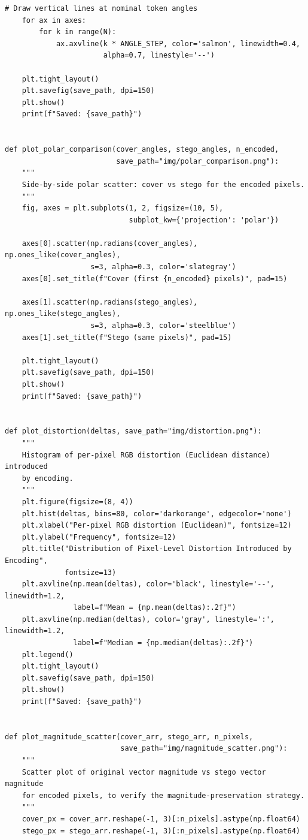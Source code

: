 \documentclass[12pt]{article}
\begin{document}
\begin{lstlisting}[caption={Comparative analysis of cover vs.\ stego image
(\texttt{analysis.py})}, label={lst:analysis}]
    # Draw vertical lines at nominal token angles
    for ax in axes:
        for k in range(N):
            ax.axvline(k * ANGLE_STEP, color='salmon', linewidth=0.4,
                       alpha=0.7, linestyle='--')

    plt.tight_layout()
    plt.savefig(save_path, dpi=150)
    plt.show()
    print(f"Saved: {save_path}")


def plot_polar_comparison(cover_angles, stego_angles, n_encoded,
                          save_path="img/polar_comparison.png"):
    """
    Side-by-side polar scatter: cover vs stego for the encoded pixels.
    """
    fig, axes = plt.subplots(1, 2, figsize=(10, 5),
                             subplot_kw={'projection': 'polar'})

    axes[0].scatter(np.radians(cover_angles), np.ones_like(cover_angles),
                    s=3, alpha=0.3, color='slategray')
    axes[0].set_title(f"Cover (first {n_encoded} pixels)", pad=15)

    axes[1].scatter(np.radians(stego_angles), np.ones_like(stego_angles),
                    s=3, alpha=0.3, color='steelblue')
    axes[1].set_title(f"Stego (same pixels)", pad=15)

    plt.tight_layout()
    plt.savefig(save_path, dpi=150)
    plt.show()
    print(f"Saved: {save_path}")


def plot_distortion(deltas, save_path="img/distortion.png"):
    """
    Histogram of per-pixel RGB distortion (Euclidean distance) introduced
    by encoding.
    """
    plt.figure(figsize=(8, 4))
    plt.hist(deltas, bins=80, color='darkorange', edgecolor='none')
    plt.xlabel("Per-pixel RGB distortion (Euclidean)", fontsize=12)
    plt.ylabel("Frequency", fontsize=12)
    plt.title("Distribution of Pixel-Level Distortion Introduced by Encoding",
              fontsize=13)
    plt.axvline(np.mean(deltas), color='black', linestyle='--', linewidth=1.2,
                label=f"Mean = {np.mean(deltas):.2f}")
    plt.axvline(np.median(deltas), color='gray', linestyle=':', linewidth=1.2,
                label=f"Median = {np.median(deltas):.2f}")
    plt.legend()
    plt.tight_layout()
    plt.savefig(save_path, dpi=150)
    plt.show()
    print(f"Saved: {save_path}")


def plot_magnitude_scatter(cover_arr, stego_arr, n_pixels,
                           save_path="img/magnitude_scatter.png"):
    """
    Scatter plot of original vector magnitude vs stego vector magnitude
    for encoded pixels, to verify the magnitude-preservation strategy.
    """
    cover_px = cover_arr.reshape(-1, 3)[:n_pixels].astype(np.float64)
    stego_px = stego_arr.reshape(-1, 3)[:n_pixels].astype(np.float64)


\end{lstlisting}
\end{document}
